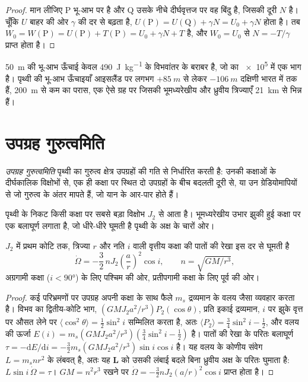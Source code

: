 \begin{proof}
मान लीजिए P भू-आभ पर है और Q उसके नीचे दीर्घवृत्तज पर वह बिंदु है, जिसकी दूरी
$N$ है। चूँकि $U$ बाहर की ओर $\gamma$ की दर से बढ़ता है,
$U(\mathrm P) = U(\mathrm Q) + \gamma N = U_0 + \gamma N$ होता है। तब
$W_0 = W(\mathrm P) = U(\mathrm P) + T(\mathrm P) = U_0 + \gamma N + T$ है, और
$W_0 = U_0$ से $N = -T/\gamma$ प्राप्त होता है।
\end{proof}

\qty{50}{m} की भू-आभ ऊँचाई केवल
\qty{490}{J.kg^{-1}} के विभवांतर के बराबर है, जो  का \num{e5} में एक भाग है। पृथ्वी की भू-आभ
ऊँचाइयाँ आइसलैंड पर लगभग $+\qty{85}{m}$ से लेकर
$-\qty{106}{m}$ दक्षिणी भारत में तक हैं,
\qty{200}{m} से कम का परास, एक ऐसे ग्रह पर जिसकी भूमध्यरेखीय और ध्रुवीय त्रिज्याएँ
\qty{21}{km} से भिन्न हैं।

\section{उपग्रह गुरुत्वमिति}

\begin{definition}[उपग्रह गुरुत्वमिति]\label{def:b3:gravity-geodesy:satgrav}
\emph{उपग्रह गुरुत्वमिति} पृथ्वी का गुरुत्व क्षेत्र
उपग्रहों की गति से निर्धारित करती है: उनकी कक्षाओं के दीर्घकालिक विक्षोभों से,
एक ही कक्षा पर स्थित दो उपग्रहों के बीच बदलती दूरी से,
या उन ग्रेडियोमापियों से जो गुरुत्व के अंतर मापते हैं,
जो यान के आर-पार होते हैं।
\end{definition}

पृथ्वी के निकट किसी कक्षा पर सबसे बड़ा विक्षोभ $J_2$ से आता है। भूमध्यरेखीय उभार
झुकी हुई कक्षा पर एक बलाघूर्ण लगाता है, जो धीरे-धीरे घूमती है
पृथ्वी के अक्ष के चारों ओर।

\begin{proposition}[पातों का पुरस्सरण]\label{prop:b3:gravity-geodesy:nodal}
$J_2$ में प्रथम कोटि तक, त्रिज्या $r$ और
नति $i$ वाली वृत्तीय कक्षा की पातों की रेखा इस दर से घूमती है
\[
  \dot\Omega = -\frac32\,nJ_2\left(\frac ar\right)^2\cos i,\qquad n = \sqrt{GM/r^3} ,
\]
अग्रगामी कक्षा ($i < \ang{90}$) के लिए पश्चिम की ओर, प्रतीपगामी कक्षा के लिए पूर्व की ओर।
\end{proposition}

\begin{proof}
कई परिभ्रमणों पर उपग्रह अपनी कक्षा के साथ फैले $m_s$ द्रव्यमान के
वलय जैसा व्यवहार करता है। विभव का द्वितीय-कोटि भाग,
$(GMJ_2a^2/r^3)P_2(\cos\theta)$, प्रति इकाई द्रव्यमान, $i$ पर झुके वृत्त पर औसत लेने पर
$\langle\cos^2\theta\rangle = \tfrac12\sin^2i$ सम्मिलित करता है, अतः
$\langle P_2\rangle = \tfrac34\sin^2i - \tfrac12$, और वलय की ऊर्जा
$E(i) = m_s(GMJ_2a^2/r^3)(\tfrac34\sin^2i - \tfrac12)$ है। पातों की रेखा के परितः बलाघूर्ण
$\tau = -\mathrm dE/\mathrm di = -\tfrac32m_s(GMJ_2a^2/r^3)\sin
i\cos i$ है। यह वलय के कोणीय संवेग $L = m_snr^2$ के लंबवत् है,
अतः यह $\mathbf L$ को उसकी लंबाई बदले बिना ध्रुवीय अक्ष के परितः घुमाता है:
$L\sin i\,\dot\Omega = \tau$। $GM = n^2r^3$ रखने पर $\dot\Omega =
-\tfrac32nJ_2(a/r)^2\cos i$ प्राप्त होता है।
\end{proof}

